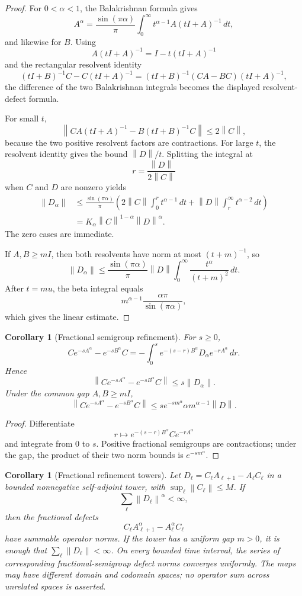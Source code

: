 \documentclass[11pt]{article}
\newtheorem{corollary}[theorem]{Corollary}
\theoremstyle{definition}
\theoremstyle{remark}
\newcommand{\norm}[1]{\left\lVert#1\right\rVert}
\begin{document}
\begin{proof}
For $0<\alpha<1$, the Balakrishnan formula gives
\[
A^\alpha
=
\frac{\sin(\pi\alpha)}{\pi}
\int_0^\infty t^{\alpha-1}A(tI+A)^{-1}\,dt,
\]
and likewise for $B$.  Using
\[
A(tI+A)^{-1}=I-t(tI+A)^{-1}
\]
and the rectangular resolvent identity
\[
(tI+B)^{-1}C-C(tI+A)^{-1}
=
(tI+B)^{-1}(CA-BC)(tI+A)^{-1},
\]
the difference of the two Balakrishnan integrals becomes the displayed resolvent-defect formula.

For small $t$,
\[
\norm{CA(tI+A)^{-1}-B(tI+B)^{-1}C}
\le 2\norm C,
\]
because the two positive resolvent factors are contractions.  For large $t$, the resolvent identity gives the bound $\norm D/t$.  Splitting the integral at
\[
r=\frac{\norm D}{2\norm C}
\]
when $C$ and $D$ are nonzero yields
\[
\begin{aligned}
\norm{D_\alpha}
&\le
\frac{\sin(\pi\alpha)}{\pi}
\left(
2\norm C\int_0^r t^{\alpha-1}\,dt
+
\norm D\int_r^\infty t^{\alpha-2}\,dt
\right)\\
&=
K_\alpha\norm C^{1-\alpha}\norm D^\alpha.
\end{aligned}
\]
The zero cases are immediate.

If $A,B\ge mI$, then both resolvents have norm at most $(t+m)^{-1}$, so
\[
\norm{D_\alpha}
\le
\frac{\sin(\pi\alpha)}{\pi}\norm D
\int_0^\infty\frac{t^\alpha}{(t+m)^2}\,dt.
\]
After $t=mu$, the beta integral equals
\[
m^{\alpha-1}\frac{\alpha\pi}{\sin(\pi\alpha)},
\]
which gives the linear estimate.
\end{proof}

\begin{corollary}[Fractional semigroup refinement]\label{cor:fractional-semigroup-refinement}
For $s\ge0$,
\[
\boxed{
Ce^{-sA^\alpha}-e^{-sB^\alpha}C
=
-\int_0^s
 e^{-(s-r)B^\alpha}D_\alpha e^{-rA^\alpha}\,dr.
}
\]
Hence
\[
\norm{Ce^{-sA^\alpha}-e^{-sB^\alpha}C}
\le s\norm{D_\alpha}.
\]
Under the common gap $A,B\ge mI$,
\[
\boxed{
\norm{Ce^{-sA^\alpha}-e^{-sB^\alpha}C}
\le
s e^{-sm^\alpha}\alpha m^{\alpha-1}\norm D.
}
\]
\end{corollary}

\begin{proof}
Differentiate
\[
r\longmapsto e^{-(s-r)B^\alpha}Ce^{-rA^\alpha}
\]
and integrate from $0$ to $s$.  Positive fractional semigroups are contractions; under the gap, the product of their two norm bounds is $e^{-sm^\alpha}$.
\end{proof}

\begin{corollary}[Fractional refinement towers]
Let $D_\ell=C_\ell A_{\ell+1}-A_\ell C_\ell$ in a bounded nonnegative self-adjoint tower, with $\sup_\ell\norm{C_\ell}\le M$.  If
\[
\sum_\ell\norm{D_\ell}^{\alpha}<\infty,
\]
then the fractional defects
\[
C_\ell A_{\ell+1}^{\alpha}-A_\ell^{\alpha}C_\ell
\]
have summable operator norms. If the tower has a uniform gap $m>0$, it is enough that $\sum_\ell\norm{D_\ell}<\infty$. On every bounded time interval, the series of corresponding fractional-semigroup defect norms converges uniformly. The maps may have different domain and codomain spaces; no operator sum across unrelated spaces is asserted.
\end{corollary}
\end{document}
